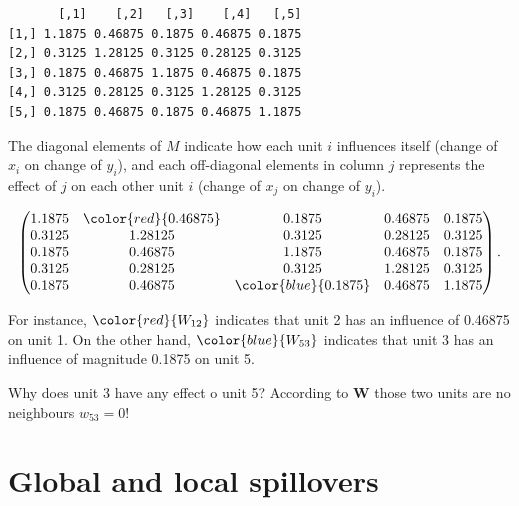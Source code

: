 \documentclass[
  letterpaper,
  DIV=11,
  numbers=noendperiod]{scrreprt}
\begin{document}
\begin{verbatim}
       [,1]    [,2]   [,3]    [,4]   [,5]
[1,] 1.1875 0.46875 0.1875 0.46875 0.1875
[2,] 0.3125 1.28125 0.3125 0.28125 0.3125
[3,] 0.1875 0.46875 1.1875 0.46875 0.1875
[4,] 0.3125 0.28125 0.3125 1.28125 0.3125
[5,] 0.1875 0.46875 0.1875 0.46875 1.1875
\end{verbatim}

The diagonal elements of \(M\) indicate how each unit \(i\) influences
itself (change of \(x_i\) on change of \(y_i\)), and each off-diagonal
elements in column \(j\) represents the effect of \(j\) on each other
unit \(i\) (change of \(x_j\) on change of \(y_i\)).

\[
\begin{split}
\begin{pmatrix}
      1.1875 & \color{red}{0.46875} & 0.1875 & 0.46875 & 0.1875 \\
      0.3125 & 1.28125 & 0.3125 & 0.28125 & 0.3125 \\
      0.1875 & 0.46875 & 1.1875 & 0.46875 & 0.1875 \\
      0.3125 & 0.28125 & 0.3125 & 1.28125 & 0.3125 \\
      0.1875 & 0.46875 & \color{blue}{0.1875} & 0.46875 & 1.1875
      \end{pmatrix}.
\end{split}
\]

For instance, \(\color{red}{W_{12}}\) indicates that unit 2 has an
influence of 0.46875 on unit 1. On the other hand,
\(\color{blue}{W_{53}}\) indicates that unit 3 has an influence of
magnitude 0.1875 on unit 5.

\begin{tcolorbox}[enhanced jigsaw, opacitybacktitle=0.6, left=2mm, leftrule=.75mm, toptitle=1mm, breakable, colback=white, bottomrule=.15mm, colframe=quarto-callout-tip-color-frame, colbacktitle=quarto-callout-tip-color!10!white, coltitle=black, bottomtitle=1mm, titlerule=0mm, title=\textcolor{quarto-callout-tip-color}{\faLightbulb}\hspace{0.5em}{Question}, opacityback=0, arc=.35mm, rightrule=.15mm, toprule=.15mm]

Why does unit 3 have any effect o unit 5? According to
\(\boldsymbol{\mathbf{W}}\) those two units are no neighbours
\(w_{53} = 0\)!

\end{tcolorbox}

\hypertarget{global-and-local-spillovers}{%
\section{Global and local
spillovers}\label{global-and-local-spillovers}}
\end{document}
